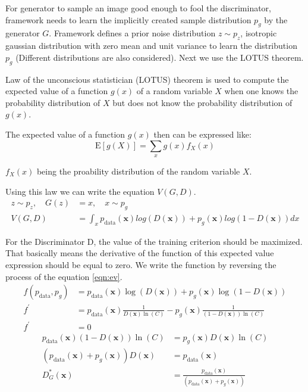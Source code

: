 For generator to sample an image good enough to fool the discriminator, framework needs to learn the
implicitly created sample distribution $p_g$ by the generator $G$. Framework defines a prior noise
distribution $z \sim p_z$, isotropic gaussian distribution with zero mean and unit variance to learn
the distribution $p_g$ (Different distributions are also considered). Next we use the LOTUS theorem.

\begin{theorem}
Law of the unconscious statistician (LOTUS) theorem is used to compute the expected value of a 
function $g(x)$ of a random variable $X$  when one knows the probability distribution of $X$ but 
does not know the probability distribution of $g(x)$. \cite{ringner2009law}
\end{theorem}

The expected value of a function $g(x)$ then can be expressed like:
\begin{equation}
    \mathrm{E}[g(X)]=\sum_{x} g(x) f_{X}(x)  
\end{equation}

$f_{X}(x)$ being the proability distribution of the random variable $X$. 

Using this law we can write the equation $V(G, D)$. 
\begin{align}
    z \sim p_z , \quad G(z) &= x, \quad x \sim p_g\\ 
    V( G, D) &= \int_x p_{\text{data}}(\boldsymbol{x}) log(D(\boldsymbol{x})) + p_g(\boldsymbol{x}) log(1 - D(\boldsymbol{x})) dx
\end{align}

For the Discriminator D, the value of the training criterion should be maximized. That basically means the
derivative of the function of this expected value expression should be equal to zero. We write the
function by reversing the process of the equation \ref{eqn:ev}.
\begin{align}
    f( p_{\text{data}}, p_g) &= p_{\text{data}}(\boldsymbol{x}) \log(D(\boldsymbol{x})) + p_g(\boldsymbol{x}) \log(1 - D(\boldsymbol{x})) \\[5pt]
    f^{\prime} &= p_{\text{data}}(\boldsymbol{x}) \frac{1}{D(\boldsymbol{x}) \ln(C)} - p_g(\boldsymbol{x}) \frac{1}{(1- D(\boldsymbol{x})) \ln(C)} \\[5pt]
    f^{\prime} &= 0
\end{align}
\begin{align}
    p_{\text{data}}(\boldsymbol{x}) (1- D(\boldsymbol{x})) \ln(C) &= p_g(\boldsymbol{x}) D(\boldsymbol{x}) \ln(C)\\[5pt]
    (p_{\text{data}}(\boldsymbol{x}) +  p_g(\boldsymbol{x})) D(\boldsymbol{x}) &= p_{\text{data}}(\boldsymbol{x})\\[5pt]
    D^{*}_G(\boldsymbol{x}) &= \frac{p_{\text{data}}(\boldsymbol{x})}{(p_{\text{data}}(\boldsymbol{x}) +  p_g(\boldsymbol{x}))}\label{eqn:opt_d}
\end{align}

